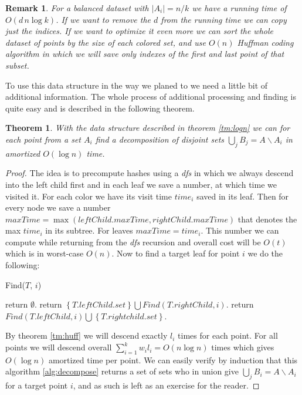 \documentclass{article}
\newtheorem{theorem}{Theorem}
\newtheorem{remark}{Remark}
\newtheorem{proof}{Proof}
\begin{document}
\begin{remark} For a balanced dataset with $|A_i| = n/k$ we have a running time of $O\left(d\,n \log k\right)$.
If we want to remove the $d$ from the running time we can copy just the indices.
If we want to optimize it even more we can sort the whole dataset of points by the size of each colored set, and use $O(n)$ Huffman coding algorithm in which we will save only indexes of the first and last point of that subset.
\end{remark}
To use this data structure in the way we planed to we need a little bit of additional information.
The whole process of additional processing and finding is quite easy and is described in the following theorem.
\begin{theorem}\label{tm:decompose}
With the data structure described in theorem \ref{tm:logn} we can for each point from a set $A_i$ find a decomposition of disjoint sets $\bigcup\limits_j B_j = A \backslash A_i$ in amortized $O(\log n)$ time.
\end{theorem}
\begin{proof}
The idea is to precompute hashes using a {\it dfs} in which we always descend into the left child first and in each leaf we save a number, at which time we visited it.
For each color we have its visit time $time_i$ saved in its leaf.
Then for every node we save a number $maxTime = \max \left(leftChild.maxTime, rightChild.maxTime\right)$ that denotes the max $time_i$ in its subtree.
For leaves $maxTime = time_i$.
This number we can compute while returning from the {\it dfs} recursion and overall cost will be $O(t)$ which is in worst-case $O(n)$.
Now to find a target leaf for point $i$ we do the following:
\begin{algorithm}
\caption{Find($T$, $i$)}\label{alg:decompose}
\begin{algorithmic}
    \State return $\emptyset$.
    \State return $\left\{T.leftChild.set \right\} \bigcup Find\left(T.rightChild,i\right)$.
    \Else
    \State return $Find\left(T.leftChild, i\right) \bigcup \left\{T.rightchild.set\right\}$.
    \EndIf
\end{algorithmic}
\end{algorithm}

By theorem \ref{tm:huff} we will descend exactly $l_i$ times for each point.
For all points we will descend overall
$\sum \limits_{i = 1}^k w_il_i = O\left(n \log n\right)$ times which gives $O(\log n)$ amortized time per point.
We can easily verify by induction that this algorithm \ref{alg:decompose} returns a set of sets who in union give $\bigcup\limits_j B_i = A \backslash A_i$ for a target point $i$, and as such is left as an exercise for the reader.
\end{proof}
\end{document}
